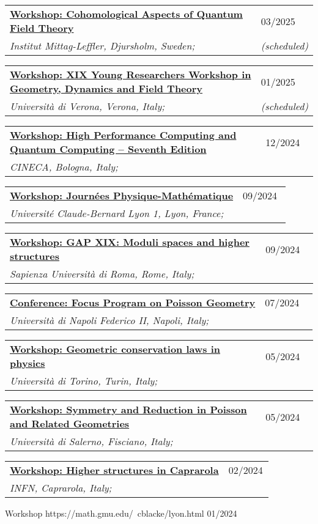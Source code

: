 \documentclass[a4paper]{article}
\newcommand{\longvoice}[8]{
    \begin{tabular}{p{0.83\linewidth} p{0.17\linewidth} }
        \textbf{\href{#3}{#2: #1}} & #4 
        \\ 
        \textit{#5, #6, #7;} & {\small\emph{#8}}
    \end{tabular}
    \vspace{.5em}
}
\begin{document}
    
    \longvoice{Cohomological Aspects of Quantum Field Theory}
        {Workshop}
        {https://www.mittag-leffler.se/activities/cohomological-aspects-of-quantum-field-theory/}
        {03/2025}
        {Institut Mittag-Leffler}
        {Djursholm}
        {Sweden}
        {(scheduled)}
    \longvoice{XIX Young Researchers Workshop in Geometry, Dynamics and Field Theory}
        {Workshop}
        {https://sites.google.com/view/xix-yrw-verona/program?authuser=0}
        {01/2025}
        {Università di Verona}
        {Verona}
        {Italy}
        {(scheduled)}
    \longvoice{High Performance Computing and Quantum Computing – Seventh Edition}
        {Workshop}
        {https://eventi.cineca.it/en/hpc/high-performance-computing-and-quantum-computing-seventh-edition/bologna-20241212}
        {12/2024}
        {CINECA}
        {Bologna}
        {Italy}
        {}
    \longvoice{Journées Physique-Mathématique}
        {Workshop}
        {https://indico.math.cnrs.fr/event/12743/overview}
        {09/2024}
        {Université Claude-Bernard Lyon 1}
        {Lyon}
        {France}
        {}
    \longvoice{GAP XIX: Moduli spaces and higher structures}
        {Workshop}
        {https://www1.mat.uniroma1.it/~fiorenza/GAP-Rome/GAP-XIX-2024-Rome.html}
        {09/2024}
        {Sapienza Università di Roma}
        {Rome}
        {Italy}
        {}
    \longvoice{Focus Program on Poisson Geometry}
        {Conference}
        {https://sites.google.com/view/poisson2024/poisson-2024?authuser=0}
        {07/2024}
        {Università di Napoli Federico II}
        {Napoli}
        {Italy}
        {}
    \longvoice{Geometric conservation laws in physics}
        {Workshop}
        {https://www.dropbox.com/scl/fi/j54tl4m10fl2scbrtc4sx/2405-Torino-Conservationlaws.pdf?rlkey=ay7nrxda4fg8lklvox578g6yj\&st=9t3jx47r\&dl=0}
        {05/2024}
        {Università di Torino}
        {Turin}
        {Italy}
        {}
    \longvoice{Symmetry and Reduction in Poisson and Related Geometries}
        {Workshop}
        {https://sites.google.com/view/poisson2024/seminars-workshops/symmetry-reduction?authuser=0}
        {05/2024}
        {Università di Salerno}
        {Fisciano}
        {Italy}
        {}
    \longvoice{Higher structures in Caprarola}
        {Workshop}
        {http://wpage.unina.it/francesco.dandrea/Caprarola2024/index.html}
        {02/2024}
        {INFN}
        {Caprarola}
        {Italy}
        {}
        {Workshop}
        {https://math.gmu.edu/~cblacke/lyon.html}
        {01/2024}
\end{document}
